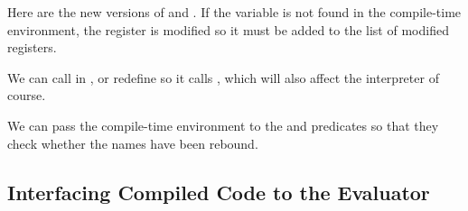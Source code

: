 \begin{exe}[5.42]
    Here are the new versions of  and 
    . If the variable is not found in the compile-time 
    environment, the  register is modified so it must be added to the 
    list of modified registers.
\end{exe}

\begin{exe}[5.43]
    We can call  in , or 
    redefine  so it calls , which will 
    also affect the interpreter of course.
\end{exe}

\begin{exe}[5.44]
    We can pass the compile-time environment to the  and 
     predicates so that they check whether the names have 
    been rebound.
\end{exe}

\subsection{Interfacing Compiled Code to the Evaluator}

